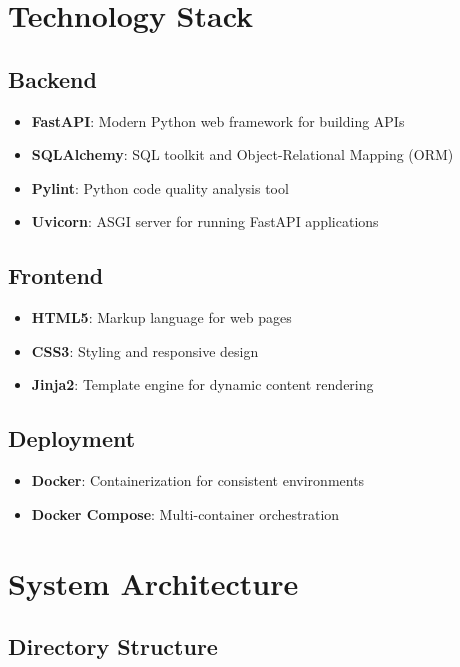 \documentclass[12pt]{article}
\begin{document}
\section{Technology Stack}

\subsection{Backend}
\begin{itemize}
    \item \textbf{FastAPI}: Modern Python web framework for building APIs
    \item \textbf{SQLAlchemy}: SQL toolkit and Object-Relational Mapping (ORM)
    \item \textbf{Pylint}: Python code quality analysis tool
    \item \textbf{Uvicorn}: ASGI server for running FastAPI applications
\end{itemize}

\subsection{Frontend}
\begin{itemize}
    \item \textbf{HTML5}: Markup language for web pages
    \item \textbf{CSS3}: Styling and responsive design
    \item \textbf{Jinja2}: Template engine for dynamic content rendering
\end{itemize}

\subsection{Deployment}
\begin{itemize}
    \item \textbf{Docker}: Containerization for consistent environments
    \item \textbf{Docker Compose}: Multi-container orchestration
\end{itemize}

\section{System Architecture}

\subsection{Directory Structure}
\end{document}
